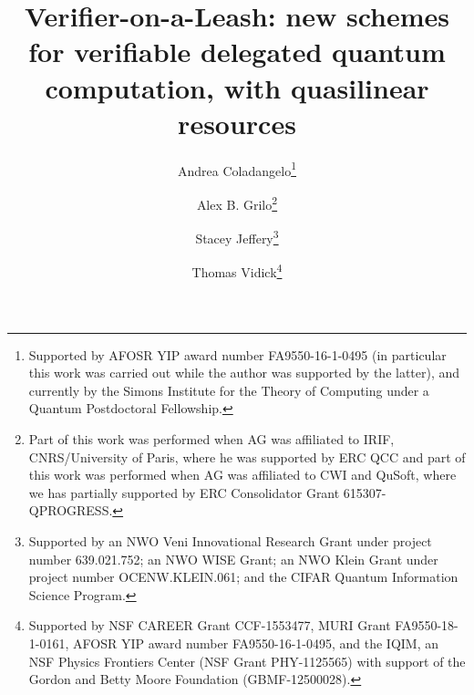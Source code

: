 \begin{frontmatter}%


\title{Verifier-on-a-Leash: new schemes for verifiable delegated quantum computation, with quasilinear resources}




\author[coladangelo]{Andrea Coladangelo\thanks{Supported by AFOSR YIP award number FA9550-16-1-0495 (in particular this work was carried out while the author was supported by the latter), and currently by the Simons Institute for the Theory of Computing under a Quantum Postdoctoral Fellowship.}}
\author[grilo]{Alex B. Grilo\thanks{Part of this work was performed when AG was affiliated to IRIF, CNRS/University of Paris, where he was supported by ERC QCC and part of this work was performed when AG was affiliated to CWI and QuSoft, where we has partially supported by ERC Consolidator Grant 615307-QPROGRESS.}}
\author[jeffery]{Stacey Jeffery\thanks{Supported by an NWO Veni Innovational Research Grant under project number 639.021.752; an NWO WISE Grant; an NWO Klein Grant under project number OCENW.KLEIN.061;
and the CIFAR Quantum Information Science Program.
}}
\author[vidick]{Thomas Vidick\thanks{Supported by NSF CAREER Grant CCF-1553477, MURI Grant FA9550-18-1-0161, AFOSR YIP award number FA9550-16-1-0495, and the IQIM, an NSF Physics Frontiers Center (NSF Grant PHY-1125565) with support of the Gordon and Betty Moore Foundation (GBMF-12500028).}}

\begin{abstract}

\end{abstract}


\end{frontmatter}
